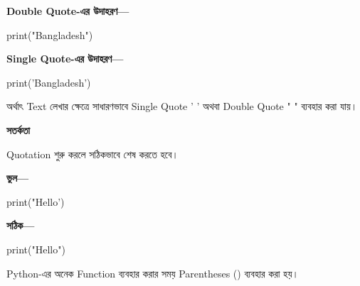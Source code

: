 \textbf{Double Quote-এর উদাহরণ—}

\begin{codebox}

\begin{english}
\ttfamily
print("Bangladesh")
\end{english}

\end{codebox}

\textbf{Single Quote-এর উদাহরণ—}

\begin{codebox}

\begin{english}
\ttfamily
print('Bangladesh')
\end{english}

\end{codebox}

অর্থাৎ Text লেখার ক্ষেত্রে সাধারণভাবে
Single Quote
\textenglish{\ttfamily ' '}
অথবা Double Quote
\textenglish{\ttfamily " "}
ব্যবহার করা যায়।

\begin{rememberbox}

\textbf{\color{deepOrange}সতর্কতা}

Quotation শুরু করলে সঠিকভাবে শেষ করতে হবে।

\textbf{ভুল—}

\begin{codebox}

\begin{english}
\ttfamily
print("Hello')
\end{english}

\end{codebox}

\textbf{সঠিক—}

\begin{codebox}

\begin{english}
\ttfamily
print("Hello")
\end{english}

\end{codebox}

\end{rememberbox}



Python-এর অনেক Function ব্যবহার করার সময়
Parentheses
\textenglish{\ttfamily ()}
ব্যবহার করা হয়।

